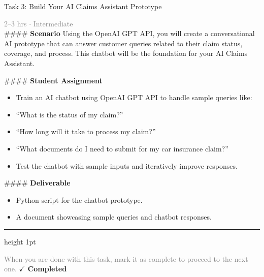 \documentclass[10pt,a4paper]{article}
\begin{document}
\begin{taskbox}{Task 3: Build Your AI Claims Assistant Prototype}

    {\small \textcolor{gray}{2--3 hrs $\cdot$ Intermediate}}\\[12pt]

    \#\#\#\# \textbf{Scenario}  
Using the OpenAI GPT API, you will create a conversational AI prototype that can answer customer queries related to their claim status, coverage, and process. This chatbot will be the foundation for your AI Claims Assistant.  

\#\#\#\# \textbf{Student Assignment}  
\begin{itemize}
    \item Train an AI chatbot using OpenAI GPT API to handle sample queries like:
    \item “What is the status of my claim?”  
    \item “How long will it take to process my claim?”  
    \item “What documents do I need to submit for my car insurance claim?”  
    \item Test the chatbot with sample inputs and iteratively improve responses.  
\end{itemize}

\#\#\#\# \textbf{Deliverable}  
\begin{itemize}
    \item Python script for the chatbot prototype.  
    \item A document showcasing sample queries and chatbot responses.\par
\end{itemize}

    \vspace{16pt}

    \textcolor{cardBorder}{\hrule height 1pt}\vspace{8pt}

    \small \textcolor{gray}{When you are done with this task, mark it as complete to proceed to the next one.} \hfill \textbf{\textcolor{brandDark}{$\checkmark$ Completed}}

\end{taskbox}
\end{document}
